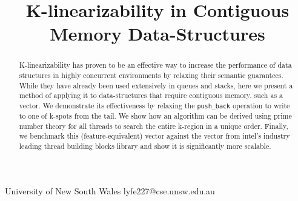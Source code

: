 \documentclass{sigplanconf}
\begin{document}
\setlength{\pdfpageheight}{\paperheight}
\setlength{\pdfpagewidth}{\paperwidth}






\title{K-linearizability in Contiguous Memory Data-Structures}

           {University of New South Wales}
           {lyfe227@cse.unsw.edu.au}

\maketitle

\newcommand{\op}{\texttt}

\begin{abstract}
K-linearizability has proven to be an effective way to increase the performance
of data structures in highly concurrent environments by relaxing their
semantic guarantees. While they have already been used extensively
in queues and stacks, here we present a method of applying it to data-structures
that require contiguous memory, such as a vector. We demonstrate
its effectiveness by relaxing the \op{push\_back} operation to write
to one of k-spots from the tail. We show how an algorithm can
be derived using prime number theory for all threads to search the
entire k-region in a unique order. Finally, we benchmark this
(feature-equivalent) vector against the vector from intel's
industry leading thread building blocks library and show it is significantly more scalable.
\end{abstract}
\end{document}
